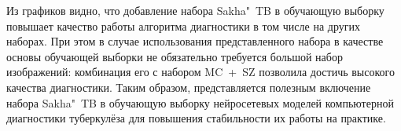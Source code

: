 



Из графиков видно, что добавление набора Sakha"~TB в обучающую выборку повышает качество работы алгоритма диагностики в том числе на других наборах. При этом в случае использования представленного набора в качестве основы обучающей выборки не обязательно требуется большой набор изображений: комбинация его с набором MC~+~SZ позволила достичь высокого качества диагностики. Таким образом, представляется полезным включение набора Sakha"~TB в обучающую выборку нейросетевых моделей компьютерной диагностики туберкулёза для повышения стабильности их работы на практике.

\clearpage